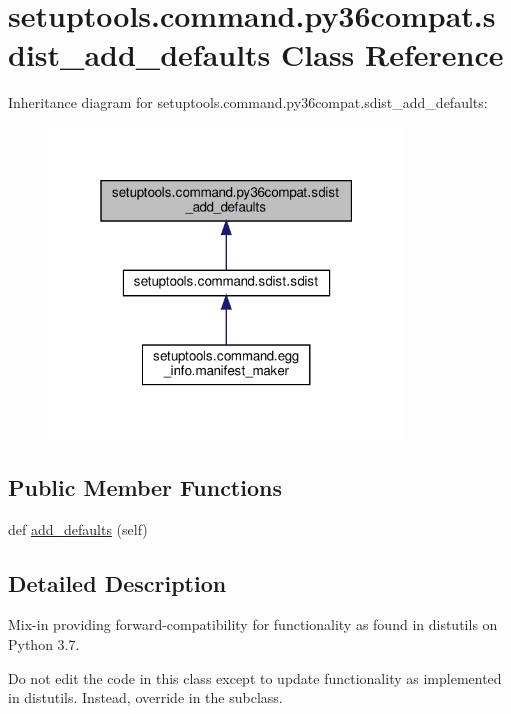 \hypertarget{classsetuptools_1_1command_1_1py36compat_1_1sdist__add__defaults}{}\section{setuptools.\+command.\+py36compat.\+sdist\+\_\+add\+\_\+defaults Class Reference}
\label{classsetuptools_1_1command_1_1py36compat_1_1sdist__add__defaults}


Inheritance diagram for setuptools.\+command.\+py36compat.\+sdist\+\_\+add\+\_\+defaults\+:
\nopagebreak
\begin{figure}[H]
\begin{center}
\leavevmode
\includegraphics[width=268pt]{classsetuptools_1_1command_1_1py36compat_1_1sdist__add__defaults__inherit__graph}
\end{center}
\end{figure}
\subsection*{Public Member Functions}
\begin{DoxyCompactItemize}
\item 
def \hyperlink{classsetuptools_1_1command_1_1py36compat_1_1sdist__add__defaults_a91682de24cf13a3d7552a8b35db9a04a}{add\+\_\+defaults} (self)
\end{DoxyCompactItemize}


\subsection{Detailed Description}
\begin{DoxyVerb}Mix-in providing forward-compatibility for functionality as found in
distutils on Python 3.7.

Do not edit the code in this class except to update functionality
as implemented in distutils. Instead, override in the subclass.
\end{DoxyVerb}
 

